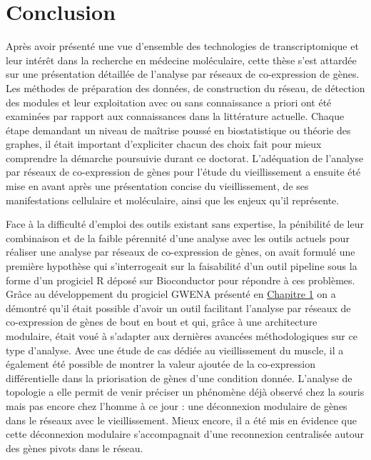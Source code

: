 \chapter*{Conclusion}         %


Après avoir présenté une vue d'ensemble des technologies de transcriptomique et leur intérêt dans la recherche en médecine moléculaire, cette thèse s'est attardée sur une présentation détaillée de l'analyse par réseaux de co-expression de gènes. Les méthodes de préparation des données, de construction du réseau, de détection des modules et leur exploitation avec ou sans connaissance a priori ont été examinées par rapport aux connaissances dans la littérature actuelle. Chaque étape demandant un niveau de maîtrise poussé en biostatistique ou théorie des graphes, il était important d'expliciter chacun des choix fait pour mieux comprendre la démarche poursuivie durant ce doctorat. 
L'adéquation de l'analyse par réseaux de co-expression de gènes pour l'étude du vieillissement a ensuite été mise en avant après une présentation concise du vieillissement, de ses manifestations cellulaire et moléculaire, ainsi que les enjeux qu'il représente.

Face à la difficulté d'emploi des outils existant sans expertise, la pénibilité de leur combinaison et de la faible pérennité d'une analyse avec les outils actuels pour réaliser une analyse par réseaux de co-expression de gènes, on avait formulé une première hypothèse qui s'interrogeait sur la faisabilité d'un outil pipeline sous la forme d'un progiciel R déposé sur Bioconductor pour répondre à ces problèmes. Grâce au développement du progiciel GWENA présenté en \hyperref[chapter:gwena]{Chapitre 1} on a démontré qu'il était possible d'avoir un outil facilitant l'analyse par réseaux de co-expression de gènes de bout en bout et qui, grâce à une architecture modulaire, était voué à s'adapter aux dernières avancées méthodologiques sur ce type d'analyse. Avec une étude de cas dédiée au vieillissement du muscle, il a également été possible de montrer la valeur ajoutée de la co-expression différentielle dans la priorisation de gènes d'une condition donnée. L'analyse de topologie a elle permit de venir préciser un phénomène déjà observé chez la souris mais pas encore chez l'homme à ce jour : une déconnexion modulaire de gènes dans le réseaux avec le vieillissement. Mieux encore, il a été mis en évidence que cette déconnexion modulaire s'accompagnait d'une reconnexion centralisée autour des gènes pivots dans le réseau.

